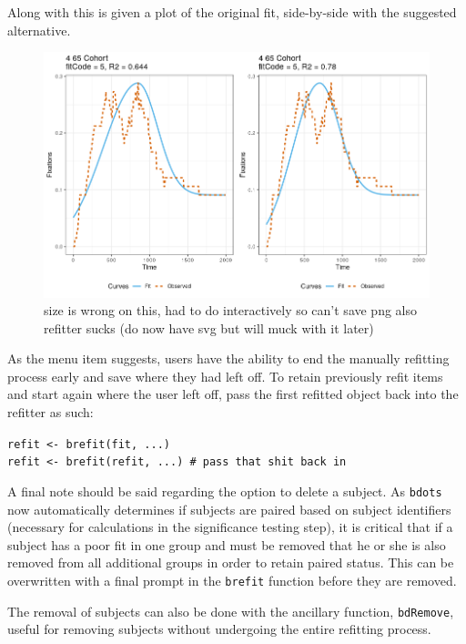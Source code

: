 \documentclass{article}
\begin{document}
Along with this is given a plot of the original fit, side-by-side with the suggested alternative. 

\begin{figure}[h!]
\centering
\includegraphics[scale=0.65]{img/refit1.png}
\caption{size is wrong on this, had to do interactively so can't save png also refitter sucks (do now have svg but will muck with it later)}
\end{figure}

As the menu item suggests, users have the ability to end the manually refitting process early and save where they had left off. To retain previously refit items and start again where the user left off, pass the first refitted object back into the refitter as such:

\begin{center}
\texttt{refit <- brefit(fit, ...)} \\
\texttt{refit <- brefit(refit, ...) \# pass that shit back in}
\end{center}

A final note should be said regarding the option to delete a subject. As \texttt{bdots} now automatically determines if subjects are paired based on subject identifiers (necessary for  calculations in the significance testing step), it is critical that if a subject has a poor fit in one group and must be removed that he or she is also removed from all additional groups in order to retain paired status. This can be overwritten with a final prompt in the \texttt{brefit} function before they are removed.

The removal of subjects can also be done with the ancillary function, \texttt{bdRemove}, useful for removing subjects without undergoing the entire refitting process. 
\end{document}
